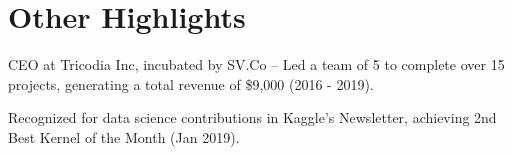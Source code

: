 \documentclass[]{deedy-resume-openfont}
\begin{document}
\begin{minipage}[t]{0.69\textwidth}
\section{Other Highlights}
\vspace{\topsep}  %
\begin{tightemize}
\item CEO at Tricodia Inc, incubated by SV.Co – Led a team of 5 to complete over 15 projects, generating a total revenue of \$9,000 (2016 - 2019).
\item Recognized for data science contributions in Kaggle’s Newsletter, achieving 2nd Best Kernel of the Month (Jan 2019).
\end{tightemize}
\sectionsep
\end{minipage} 
\end{document}
